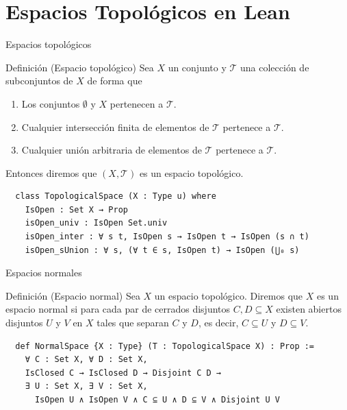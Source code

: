 \documentclass{beamer}
\begin{document}
\section{Espacios Topológicos en Lean}

\begin{frame}[fragile]{Espacios topológicos}
  \begin{block}{Definición (Espacio topológico)}
    Sea $X$ un conjunto y $\mathcal{T}$ una colección de subconjuntos de $X$ de forma que
    \begin{enumerate}
      \item Los conjuntos $\emptyset$ y $X$ pertenecen a $\mathcal{T}$.
      \item Cualquier intersección finita de elementos de $\mathcal{T}$ pertenece a $\mathcal{T}$.
      \item Cualquier unión arbitraria de elementos de $\mathcal{T}$ pertenece a $\mathcal{T}$.
    \end{enumerate}
    Entonces diremos que $(X, \mathcal{T})$ es un \textnormal{espacio topológico}.
  \end{block}

  \begin{lstlisting}
  class TopologicalSpace (X : Type u) where
    IsOpen : Set X → Prop
    isOpen_univ : IsOpen Set.univ
    isOpen_inter : ∀ s t, IsOpen s → IsOpen t → IsOpen (s ∩ t)
    isOpen_sUnion : ∀ s, (∀ t ∈ s, IsOpen t) → IsOpen (⋃₀ s) \end{lstlisting}
\end{frame}

\begin{frame}[fragile]{Espacios normales}
  
  \begin{block}{Definición (Espacio normal)}
     Sea $X$ un espacio topológico. Diremos que $X$ es un espacio \textnormal{normal} si para cada par de cerrados disjuntos $C, D \subseteq X$ existen abiertos disjuntos $U$ y $V$ en $X$ tales que separan $C$ y $D$, es decir, $C \subseteq U$ y $D \subseteq V$.
  \end{block}

  \begin{lstlisting}
  def NormalSpace {X : Type} (T : TopologicalSpace X) : Prop :=
    ∀ C : Set X, ∀ D : Set X,
    IsClosed C → IsClosed D → Disjoint C D →
    ∃ U : Set X, ∃ V : Set X,
      IsOpen U ∧ IsOpen V ∧ C ⊆ U ∧ D ⊆ V ∧ Disjoint U V \end{lstlisting}
\end{frame}
\end{document}
